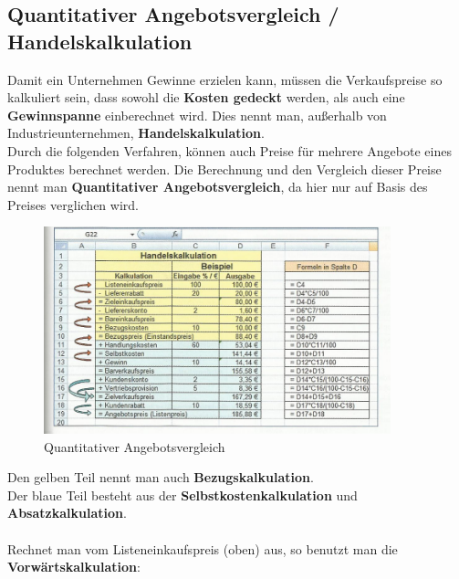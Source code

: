 \documentclass[10pt]{article}
\begin{document}
\subsection{Quantitativer Angebotsvergleich / Handelskalkulation}
\label{sec:Handelskalkulation}
Damit ein Unternehmen Gewinne erzielen kann, müssen die Verkaufspreise so kalkuliert sein, dass sowohl die \textbf{Kosten gedeckt} werden, als auch eine \textbf{Gewinnspanne} einberechnet wird. Dies nennt man, außerhalb von Industrieunternehmen, \textbf{Handelskalkulation}. \\
Durch die folgenden Verfahren, können auch Preise für mehrere Angebote eines Produktes berechnet werden. Die Berechnung und den Vergleich dieser Preise nennt man \textbf{Quantitativer Angebotsvergleich}, da hier nur auf Basis des Preises verglichen wird.
\begin{figure}[H]
\begin{center}
  \includegraphics[height=6cm]{quantitativ.png}
  \end{center}
  \caption{Quantitativer Angebotsvergleich}
  \label{fig:Quantitativer Angebotsvergleich}
\end{figure}
Den gelben Teil nennt man auch \textbf{Bezugskalkulation}. \\
Der blaue Teil besteht aus der \textbf{Selbstkostenkalkulation} und \textbf{Absatzkalkulation}. \\ \\
Rechnet man vom Listeneinkaufspreis (oben) aus, so benutzt man die \textbf{Vorw\"artskalkulation}:
\end{document}
